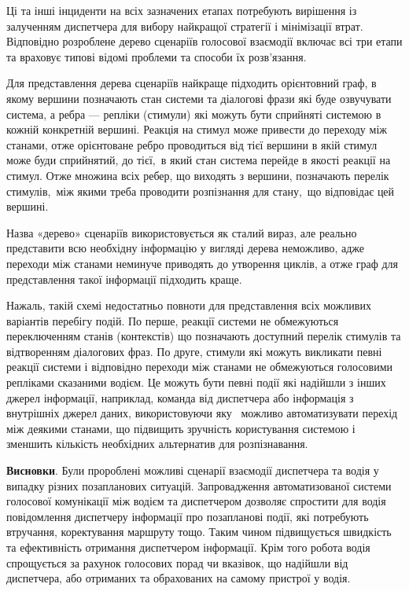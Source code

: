 Ці та інші інциденти на всіх зазначених етапах потребують вирішення із залученням диспетчера для вибору найкращої стратегії і мінімізації втрат. Відповідно розроблене дерево сценаріїв голосової взаємодії включає всі три етапи та враховує типові відомі проблеми та способи їх розв’язання.

Для представлення дерева сценаріїв найкраще підходить орієнтовний граф, в якому вершини позначають стан системи та діалогові фрази які буде озвучувати система, а ребра --- репліки (стимули) які можуть бути сприйняті системою в кожній конкретній вершині. Реакція на стимул може привести до переходу між станами, отже орієнтоване ребро проводиться від тієї вершини в якій стимул може буди сприйнятий, до тієї, в який стан система перейде в якості реакції на стимул. Отже множина всіх ребер, що виходять з вершини, позначають перелік стимулів, між якими треба проводити розпізнання для стану, що відповідає цей вершині.

Назва «дерево» сценаріїв використовується як сталий вираз, але реально представити всю необхідну інформацію у вигляді дерева неможливо, адже переходи між станами неминуче приводять до утворення циклів, а отже граф для представлення такої інформації підходить краще.

Нажаль, такій схемі недостатньо повноти для представлення всіх можливих варіантів перебігу подій. По перше, реакції системи не обмежуються переключенням станів (контекстів) що позначають доступний перелік стимулів та відтворенням діалогових фраз. По друге, стимули які можуть викликати певні реакції системи і відповідно переходи між станами не обмежуються голосовими репліками сказаними водієм. Це можуть бути певні події які надійшли з інших джерел інформації, наприклад, команда від диспетчера або інформація з внутрішніх джерел даних,  використовуючи яку  можливо автоматизувати перехід між деякими станами, що підвищить зручність користування системою і зменшить кількість необхідних альтернатив для розпізнавання. 

\textbf{Висновки}. Були пророблені можливі сценарії взаємодії диспетчера та водія у випадку різних позапланових ситуацій. Запровадження автоматизованої системи голосової комунікації між водієм та диспетчером дозволяє спростити для водія повідомлення диспетчеру інформації про позапланові події, які потребують втручання, коректування маршруту тощо. Таким чином підвищується швидкість та ефективність отримання диспетчером інформації. Крім того робота водія спрощується за рахунок голосових порад чи вказівок,  що надійшли від диспетчера, або отриманих та обрахованих на самому пристрої у водія.